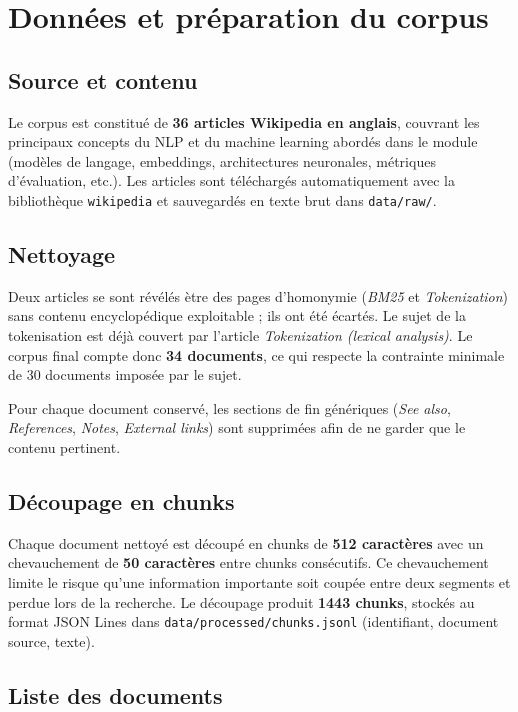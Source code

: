 \section{Donn\'ees et pr\'eparation du corpus}
\label{sec:donnees}

\subsection{Source et contenu}

Le corpus est constitu\'e de \textbf{36 articles Wikipedia en anglais}, couvrant les principaux
concepts du NLP et du machine learning abord\'es dans le module (mod\`eles de langage, embeddings,
architectures neuronales, m\'etriques d'\'evaluation, etc.). Les articles sont t\'el\'echarg\'es
automatiquement avec la biblioth\`eque \texttt{wikipedia} et sauvegard\'es en texte brut dans
\texttt{data/raw/}.

\subsection{Nettoyage}

Deux articles se sont r\'ev\'el\'es \`etre des pages d'homonymie (\emph{BM25} et
\emph{Tokenization}) sans contenu encyclop\'edique exploitable ; ils ont \'et\'e \'ecart\'es. Le
sujet de la tokenisation est d\'ej\`a couvert par l'article \emph{Tokenization (lexical analysis)}.
Le corpus final compte donc \textbf{34 documents}, ce qui respecte la contrainte minimale de
30 documents impos\'ee par le sujet.

Pour chaque document conserv\'e, les sections de fin g\'en\'eriques (\emph{See also},
\emph{References}, \emph{Notes}, \emph{External links}) sont supprim\'ees afin de ne garder que
le contenu pertinent.

\subsection{D\'ecoupage en chunks}

Chaque document nettoy\'e est d\'ecoup\'e en chunks de \textbf{512 caract\`eres} avec un
chevauchement de \textbf{50 caract\`eres} entre chunks cons\'ecutifs. Ce chevauchement limite le
risque qu'une information importante soit coup\'ee entre deux segments et perdue lors de la
recherche. Le d\'ecoupage produit \textbf{1443 chunks}, stock\'es au format JSON Lines dans
\texttt{data/processed/chunks.jsonl} (identifiant, document source, texte).

\subsection{Liste des documents}


